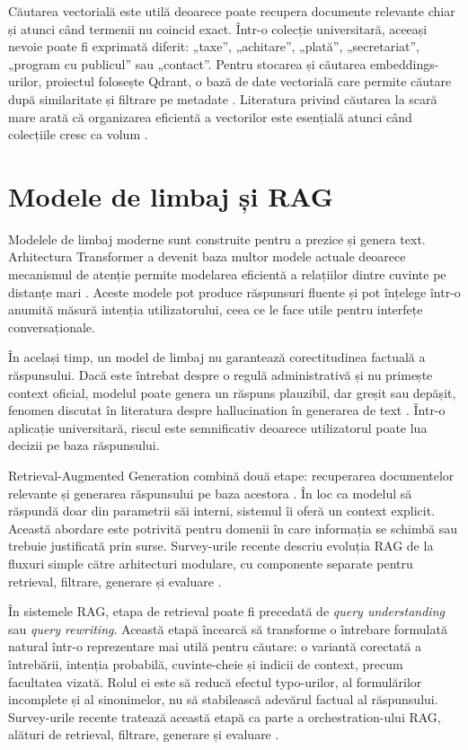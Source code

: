 \documentclass[12pt,a4paper]{report}
\theoremstyle{definition}
\theoremstyle{remark}
\begin{document}
Căutarea vectorială este utilă deoarece poate recupera documente relevante chiar și atunci când termenii nu coincid exact. Într-o colecție universitară, aceeași nevoie poate fi exprimată diferit: „taxe”, „achitare”, „plată”, „secretariat”, „program cu publicul” sau „contact”. Pentru stocarea și căutarea embeddings-urilor, proiectul folosește Qdrant, o bază de date vectorială care permite căutare după similaritate și filtrare pe metadate \cite{QdrantDocs}. Literatura privind căutarea la scară mare arată că organizarea eficientă a vectorilor este esențială atunci când colecțiile cresc ca volum \cite{Johnson2017Billion}.

\section{Modele de limbaj și RAG}
Modelele de limbaj moderne sunt construite pentru a prezice și genera text. Arhitectura Transformer a devenit baza multor modele actuale deoarece mecanismul de atenție permite modelarea eficientă a relațiilor dintre cuvinte pe distanțe mari \cite{Vaswani2017Attention}. Aceste modele pot produce răspunsuri fluente și pot înțelege într-o anumită măsură intenția utilizatorului, ceea ce le face utile pentru interfețe conversaționale.

În același timp, un model de limbaj nu garantează corectitudinea factuală a răspunsului. Dacă este întrebat despre o regulă administrativă și nu primește context oficial, modelul poate genera un răspuns plauzibil, dar greșit sau depășit, fenomen discutat în literatura despre hallucination în generarea de text \cite{Ji2023Hallucination}. Într-o aplicație universitară, riscul este semnificativ deoarece utilizatorul poate lua decizii pe baza răspunsului.

Retrieval-Augmented Generation combină două etape: recuperarea documentelor relevante și generarea răspunsului pe baza acestora \cite{Lewis2020RAG}. În loc ca modelul să răspundă doar din parametrii săi interni, sistemul îi oferă un context explicit. Această abordare este potrivită pentru domenii în care informația se schimbă sau trebuie justificată prin surse. Survey-urile recente descriu evoluția RAG de la fluxuri simple către arhitecturi modulare, cu componente separate pentru retrieval, filtrare, generare și evaluare \cite{Lewis2020RAG,Gao2023RAGSurvey}.

În sistemele RAG, etapa de retrieval poate fi precedată de \textit{query understanding} sau \textit{query rewriting}. Această etapă încearcă să transforme o întrebare formulată natural într-o reprezentare mai utilă pentru căutare: o variantă corectată a întrebării, intenția probabilă, cuvinte-cheie și indicii de context, precum facultatea vizată. Rolul ei este să reducă efectul typo-urilor, al formulărilor incomplete și al sinonimelor, nu să stabilească adevărul factual al răspunsului. Survey-urile recente tratează această etapă ca parte a orchestration-ului RAG, alături de retrieval, filtrare, generare și evaluare \cite{Gao2023RAGSurvey}.
\end{document}
